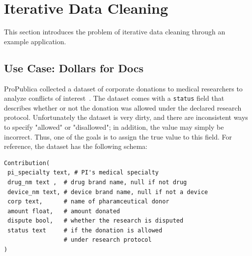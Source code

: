 \section{Iterative Data Cleaning}\label{background}
This section introduces the problem of iterative data cleaning through an example application.

\subsection{Use Case: Dollars for Docs}\label{s:usecase}
ProPublica collected a dataset of corporate donations to medical researchers to analyze conflicts of interest~\cite{dollarsfordocsa}. 
The dataset comes with a \texttt{status} field that describes whether or not the donation was allowed under the declared research protocol.
Unfortunately the dataset is very dirty, and there are inconsistent ways to specify "allowed" or "disallowed"; in addition, the value may simply be incorrect.
Thus, one of the goals is to assign the true value to this field.  For reference, the dataset has the following schema:

{\ssmall\begin{verbatim}
Contribution(
 pi_specialty text, # PI's medical specialty
 drug_nm text ,  # drug brand name, null if not drug
 device_nm text, # device brand name, null if not a device
 corp text,      # name of pharamceutical donor
 amount float,   # amount donated
 dispute bool,   # whether the research is disputed
 status text     # if the donation is allowed 
                 # under research protocol
)
\end{verbatim}
}

% 
% 
% 
% 
% 
% 
% 



